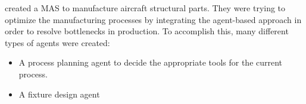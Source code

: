 \citeauthor{6221793} \cite{6221793} created a MAS to manufacture aircraft structural parts. They were trying to optimize the manufacturing processes by integrating the agent-based approach in order to resolve bottlenecks in production. To accomplish this, many different types of agents were created:

\begin{itemize}
	\item A process planning agent to decide the appropriate tools for the current process.
	\item A fixture design agent 
\end{itemize}